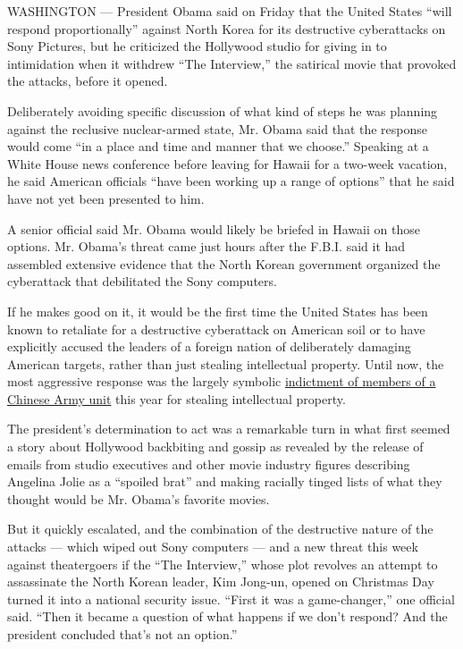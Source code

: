WASHINGTON --- President Obama said on Friday that the United States
``will respond proportionally'' against North Korea for its destructive
cyberattacks on Sony Pictures, but he criticized the Hollywood studio
for giving in to intimidation when it withdrew ``The Interview,'' the
satirical movie that provoked the attacks, before it opened.

Deliberately avoiding specific discussion of what kind of steps he was
planning against the reclusive nuclear-armed state, Mr. Obama said that
the response would come ``in a place and time and manner that we
choose.'' Speaking at a White House news conference before leaving for
Hawaii for a two-week vacation, he said American officials ``have been
working up a range of options'' that he said have not yet been presented
to him.

A senior official said Mr. Obama would likely be briefed in Hawaii on
those options. Mr. Obama's threat came just hours after the F.B.I. said
it had assembled extensive evidence that the North Korean government
organized the cyberattack that debilitated the Sony computers.

If he makes good on it, it would be the first time the United States has
been known to retaliate for a destructive cyberattack on American soil
or to have explicitly accused the leaders of a foreign nation of
deliberately damaging American targets, rather than just stealing
intellectual property. Until now, the most aggressive response was the
largely symbolic
\href{http://www.nytimes.com/2014/05/20/us/us-to-charge-chinese-workers-with-cyberspying.html}{indictment
of members of a Chinese Army unit} this year for stealing intellectual
property.

The president's determination to act was a remarkable turn in what first
seemed a story about Hollywood backbiting and gossip as revealed by the
release of emails from studio executives and other movie industry
figures describing Angelina Jolie as a ``spoiled brat'' and making
racially tinged lists of what they thought would be Mr. Obama's favorite
movies.

But it quickly escalated, and the combination of the destructive nature
of the attacks --- which wiped out Sony computers --- and a new threat
this week against theatergoers if the ``The Interview,'' whose plot
revolves an attempt to assassinate the North Korean leader, Kim Jong-un,
opened on Christmas Day turned it into a national security issue.
``First it was a game-changer,'' one official said. ``Then it became a
question of what happens if we don't respond? And the president
concluded that's not an option.''


